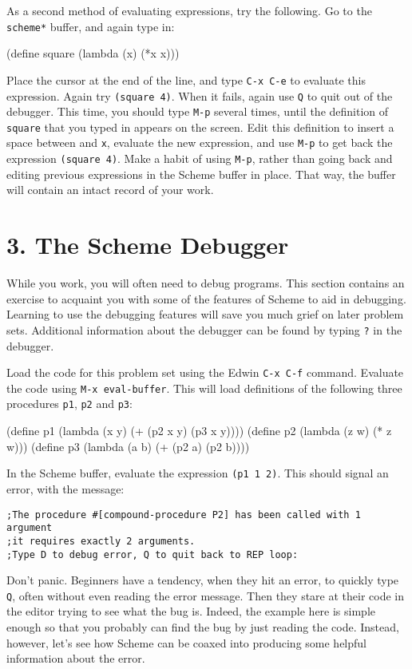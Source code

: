 As a second method of evaluating expressions, try the following.  Go
to the {\tt *scheme*} buffer, and again type in:

\beginlisp
(define square (lambda (x) (*x x)))
\endlisp

Place the cursor at the end of the line, and type {\tt C-x C-e} to
evaluate this expression.  Again try {\tt (square 4)}.  When it fails,
again use {\tt Q} to quit out of the debugger.  This time, you should
type {\tt M-p} several times, until the definition of {\tt square}
that you typed in appears on the screen.  Edit this definition to
insert a space between {\tt *} and {\tt x}, evaluate the new
expression, and use {\tt M-p} to get back the expression {\tt (square
4)}.  Make a habit of using {\tt M-p}, rather than going back and
editing previous expressions in the Scheme buffer in place.  That
way, the buffer will contain an intact record of your work.

\section{3. The Scheme Debugger}

While you work, you will often need to debug programs.  This
section contains an exercise to acquaint you with some of the features
of Scheme to aid in debugging.  Learning to use the debugging features
will save you much grief on later problem sets.  Additional
information about the debugger can be found by typing {\tt ?} in the debugger.

Load the code for this problem set using the Edwin {\tt C-x C-f}
command. Evaluate the code using {\tt M-x eval-buffer}.  This will
load definitions of the following three procedures {\tt p1}, {\tt p2}
and {\tt p3}:


\beginlisp
(define p1
  (lambda (x y)
    (+ (p2 x y)
       (p3 x y))))
\null
(define p2
  (lambda (z w)
    (* z w)))
\null
(define p3
  (lambda (a b)
    (+ (p2 a)
       (p2 b))))
\endlisp

In the Scheme buffer, evaluate the expression {\tt (p1 1 2)}.  This
should signal an error, with the message:

{\small
\begin{verbatim}
;The procedure #[compound-procedure P2] has been called with 1 argument
;it requires exactly 2 arguments.
;Type D to debug error, Q to quit back to REP loop: 
\end{verbatim}
}

Don't panic.  Beginners have a tendency, when they hit an error, to
quickly type {\tt Q}, often without even reading the error message.
Then they stare at their code in the editor trying to see what the bug
is.  Indeed, the example here is simple enough so that you probably
can find the bug by just reading the code.  Instead, however, let's
see how Scheme can be coaxed into producing some helpful information
about the error.

